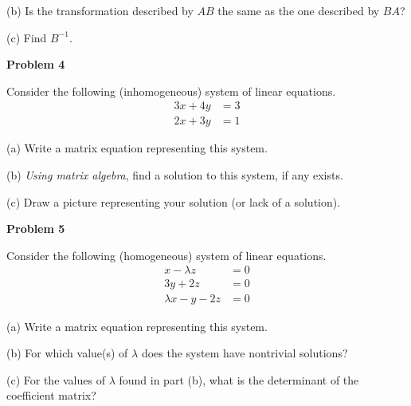 \documentclass[12pt]{amsbook}
\begin{document}
\vspace{3cm}

(b) Is the transformation described by $AB$ the same as the one described by $BA$?

\vspace{4cm}

(c) Find $B^{-1}$.




\newpage

\textbf{Problem 4}

\vspace{.25cm}

Consider the following (inhomogeneous) system of linear equations.
\begin{align*}
3x + 4y &= 3 \\
2x + 3y &= 1
\end{align*}

(a) Write a matrix equation representing this system.

\vspace{3cm}

(b) \emph{Using matrix algebra}, find a solution to this system, if any exists.

\vspace{9cm}

(c) Draw a picture representing your solution (or lack of a solution).










\newpage

\textbf{Problem 5}

\vspace{.25cm}

Consider the following (homogeneous) system of linear equations.
\begin{align*}
x - \lambda z &= 0 \\
3y + 2z &= 0 \\
\lambda x - y - 2z &= 0
\end{align*}

(a) Write a matrix equation representing this system.

\vspace{3cm}

(b) For which value(s) of $\lambda$ does the system have nontrivial solutions?
\vspace{5cm}





(c) For the values of $\lambda$ found in part (b), what is the determinant of the coefficient matrix?
\end{document}
